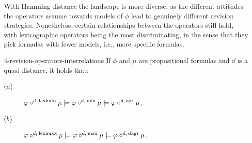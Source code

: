 With Hamming distance
the landscape is more diverse,
as the different attitudes the operators
assume towards models of $\phi$ lead to genuinely different
revision strategies.
Nonetheless,
certain relationships between the operators still hold, with
lexicographic operators being the most
discriminating, in the sense that they pick
formulas with fewer models, i.e., more specific formulas.

\begin{prp}{}{4-revision-operators-interrelations}
	If $\phi$ and $\mu$ are propositional formulas and $\dd$ is a quasi-distance,
	it holds that:
		\begin{description}
			\item[($a$)] $\varphi\circ^{d,\:{\operatorname{leximin}}}\mu\models\varphi\circ^{d,\:{\operatorname{min}}}\mu\models\varphi\circ^{d,\:\mathrm{agr}}\mu$,
			\item[($b$)] $\varphi\circ^{d,\:{\operatorname{leximax}}}\mu\models\varphi\circ^{d,\:{\operatorname{max}}}\mu\models\varphi\circ^{d,\:\mathrm{dagr}}\mu$.
		\end{description}
\end{prp}


